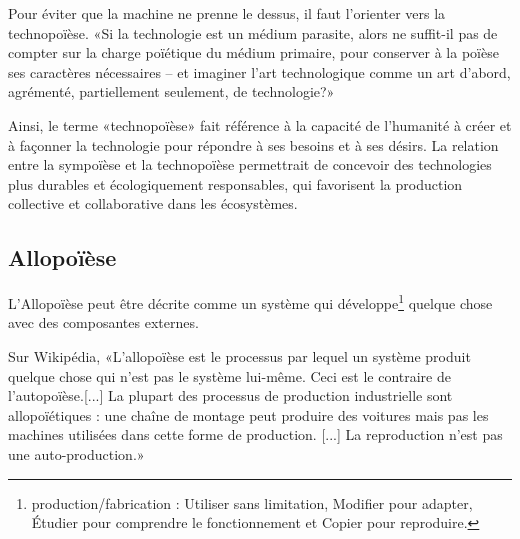 Pour éviter que la machine ne prenne le dessus, il faut l'orienter vers la technopoïèse. «Si la technologie est un médium parasite, alors ne suffit-il pas de compter sur la charge poïétique du médium primaire, pour conserver à la poïèse ses caractères nécessaires – et imaginer l’art technologique comme un art d’abord, agrémenté, partiellement seulement, de technologie?»~\cite{artiste_techno_conf_2012} %


Ainsi, le terme «technopoïèse» fait référence à la capacité de l'humanité à créer et à façonner la technologie pour répondre à ses besoins et à ses désirs. La relation entre la sympoïèse et la technopoïèse permettrait de concevoir des technologies plus durables et écologiquement responsables, qui favorisent la production collective et collaborative dans les écosystèmes. 

\subsection{Allopoïèse}

L'Allopoïèse peut être décrite comme un système qui développe\footnote{production/fabrication : Utiliser sans limitation, Modifier pour adapter, Étudier pour comprendre le fonctionnement et Copier pour reproduire.} quelque chose avec des composantes externes.

Sur Wikipédia, «L'allopoïèse est le processus par lequel un système produit quelque chose qui n'est pas le système lui-même. Ceci est le contraire de l'autopoïèse.[...] La plupart des processus de production industrielle sont allopoïétiques : une chaîne de montage peut produire des voitures mais pas les machines utilisées dans cette forme de production. [...] La reproduction n'est pas une auto-production.»~\cite{wiki_allopoiesis_2018}~\cite{vuc_allopoiesis_2018}

